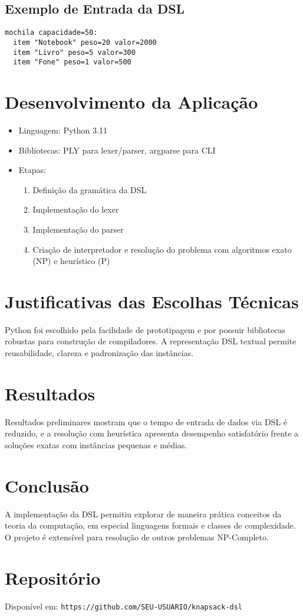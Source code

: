 \documentclass[conference]{IEEEtran}
\begin{document}
\subsection{Exemplo de Entrada da DSL}
\begin{lstlisting}
mochila capacidade=50:
  item "Notebook" peso=20 valor=2000
  item "Livro" peso=5 valor=300
  item "Fone" peso=1 valor=500
\end{lstlisting}

\section{Desenvolvimento da Aplicação}
\begin{itemize}
    \item Linguagem: Python 3.11
    \item Bibliotecas: PLY para lexer/parser, argparse para CLI
    \item Etapas:
    \begin{enumerate}
        \item Definição da gramática da DSL
        \item Implementação do lexer
        \item Implementação do parser
        \item Criação de interpretador e resolução do problema com algoritmos exato (NP) e heurístico (P)
    \end{enumerate}
\end{itemize}

\section{Justificativas das Escolhas Técnicas}
Python foi escolhido pela facilidade de prototipagem e por possuir bibliotecas robustas para construção de compiladores. A representação DSL textual permite reusabilidade, clareza e padronização das instâncias.

\section{Resultados}
Resultados preliminares mostram que o tempo de entrada de dados via DSL é reduzido, e a resolução com heurística apresenta desempenho satisfatório frente a soluções exatas com instâncias pequenas e médias.

\section{Conclusão}
A implementação da DSL permitiu explorar de maneira prática conceitos da teoria da computação, em especial linguagens formais e classes de complexidade. O projeto é extensível para resolução de outros problemas NP-Completo.

\section*{Repositório}
Disponível em: \texttt{https://github.com/SEU-USUARIO/knapsack-dsl}



\end{document}
